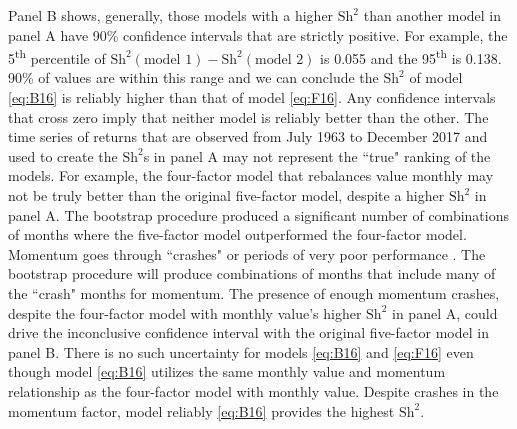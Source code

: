 Panel B shows, generally, those models with a higher $\text{Sh}^2$ than another
model in panel A have 90\% confidence intervals that are strictly positive.
For example, the 5\textsuperscript{th} percentile of
$\text{Sh}^2(\text{model 1})-\text{Sh}^2(\text{model 2})$ is 0.055 and the
95\textsuperscript{th} is 0.138. 90\% of values are within this range and we
can conclude the $\text{Sh}^2$ of model \ref{eq:B16} is reliably higher
than that of model \ref{eq:F16}.
Any confidence intervals that cross zero imply that neither model is reliably
better than the other.
The time series of returns that are observed from July 1963 to December 2017
and used to create the $\text{Sh}^2$s in panel A may not represent the ``true"
ranking of the models.
For example, the four-factor model that rebalances value monthly may not be
truly better than the original five-factor model, despite a higher
$\text{Sh}^2$ in panel A.
The bootstrap procedure produced a significant number of combinations of months
where the five-factor model outperformed the four-factor model.
Momentum goes through ``crashes" or periods of very poor performance
\parencite{daniel2016momentum, barroso2015momentum}.
The bootstrap procedure will produce combinations of months that include
many of the ``crash" months for momentum.
The presence of enough momentum crashes, despite the four-factor model with
monthly value's higher $\text{Sh}^2$ 
in panel A, could drive the inconclusive confidence interval with the original
five-factor model in panel B.
There is no such uncertainty for models \ref{eq:B16} and \ref{eq:F16}
even though model \ref{eq:B16} utilizes the same monthly value and momentum
relationship as the four-factor model with monthly value.
Despite crashes in the momentum factor, model reliably \ref{eq:B16} provides
the highest $\text{Sh}^2$.

